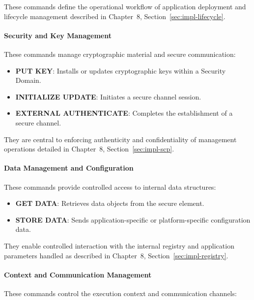 These commands define the operational workflow of application deployment and
lifecycle management  described in
Chapter~8, Section~\ref{sec:impl-lifecycle}.

\paragraph{Security and Key Management}

These commands manage cryptographic material and secure communication:

\begin{itemize}
\item \textbf{PUT KEY}: Installs or updates cryptographic keys within a
    Security Domain.
\item \textbf{INITIALIZE UPDATE}: Initiates a secure channel session.
\item \textbf{EXTERNAL AUTHENTICATE}: Completes the establishment of a secure
    channel.
\end{itemize}

They are central to enforcing authenticity and confidentiality of management
operations   detailed in
Chapter~8, Section~\ref{sec:impl-scp}.

\paragraph{Data Management and Configuration}

These commands provide controlled access to internal data structures:

\begin{itemize}
\item \textbf{GET DATA}: Retrieves data objects from the secure element.
\item \textbf{STORE DATA}: Sends application-specific or platform-specific
    configuration data.
\end{itemize}

They enable controlled interaction with the internal registry and application
parameters  handled as described in Chapter~8,
Section~\ref{sec:impl-registry}.

\paragraph{Context and Communication Management}

These commands control the execution context and communication channels:

